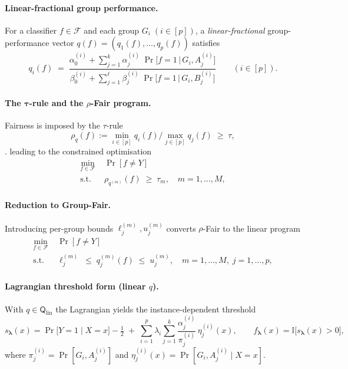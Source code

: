 \documentclass[12pt,a4paper,openright,twoside]{book}
\begin{document}
\paragraph{Linear-fractional group performance.}
For a classifier $f\!\in\!\mathcal{F}$ and each group $G_i\;(i\!\in\![p])$, a \emph{linear-fractional} group-performance vector $q(f)=(q_1(f),\dots,q_p(f))$ satisfies \cite{celis2020classificationfairnessconstraintsmetaalgorithm}
\[
q_i(f)\;=\;
\frac{\displaystyle 
\alpha^{(i)}_0+\sum_{j=1}^{k}\alpha^{(i)}_j\;
      \Pr\!\bigl[f=1\,\bigl\vert\,G_i,A^{(i)}_{j}\bigr]}
     {\displaystyle
      \beta^{(i)}_0+\sum_{j=1}^{\ell}\beta^{(i)}_j\;
      \Pr\!\bigl[f=1\,\bigl\vert\,G_i,B^{(i)}_{j}\bigr]}
\qquad(i\in[p]).
\]

\paragraph{The $\boldsymbol{\tau}$-rule and the \texorpdfstring{$\rho$}{rho}-Fair program.}
Fairness is imposed by the $\tau$-rule
\[
\rho_q(f):=\min_{i\in[p]}q_i(f)/\max_{j\in[p]}q_j(f)\;\ge\;\tau,
\] \cite{celis2020classificationfairnessconstraintsmetaalgorithm}.
leading to the constrained optimisation
\[
\begin{aligned}
\min_{f\in\mathcal{F}}\;&\Pr[f\neq Y]\\
\text{s.t.}\;&\rho_{q^{(m)}}(f)\;\ge\;\tau_m,\quad m=1,\dots,M,
\end{aligned}
\tag{$\rho$-Fair} %
\]

\paragraph{Reduction to Group-Fair.}
Introducing per-group bounds $\ell_j^{(m)},u_j^{(m)}$ converts $\rho$-Fair to the linear program \cite{celis2020classificationfairnessconstraintsmetaalgorithm}
\[
\begin{aligned}
\min_{f\in\mathcal{F}}\;&\Pr[f\neq Y]\\
\text{s.t.}\;&\ell^{(m)}_j\;\le\;q^{(m)}_j(f)\;\le\;u^{(m)}_j,
\quad m=1,\dots,M,\;j=1,\dots,p,
\end{aligned}
\tag{Group-Fair}
\]

\paragraph{Lagrangian threshold form (linear $q$).}
With $q\in\mathsf{Q}_{\text{lin}}$ the Lagrangian yields the instance-dependent threshold \cite{celis2020classificationfairnessconstraintsmetaalgorithm}
\[
s_{\boldsymbol\lambda}(x)=
\Pr\!\bigl[Y=1\mid X=x\bigr]-\tfrac12
\;+\;
\sum_{i=1}^{p}\lambda_i
  \sum_{j=1}^{k}
      \frac{\alpha^{(i)}_j}{\pi^{(i)}_j}\,
      \eta^{(i)}_j(x),
\qquad
f_{\boldsymbol\lambda}(x)=\mathbb{I}\bigl[s_{\boldsymbol\lambda}(x)>0\bigr],
\]
where $\pi^{(i)}_j=\Pr[G_i,A^{(i)}_j]$ and $\eta^{(i)}_j(x)=\Pr[G_i,A^{(i)}_j\mid X=x]$.
\end{document}
